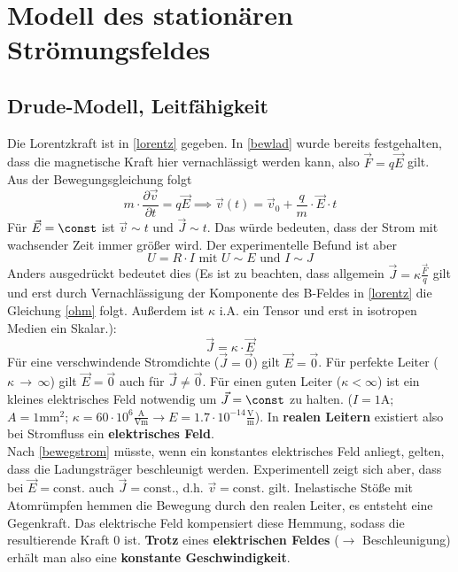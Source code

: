 \section{Modell des stationären Strömungsfeldes}
 \subsection{Drude-Modell, Leitfähigkeit}
	  Die Lorentzkraft ist in \ref{lorentz} gegeben. In \ref{bewlad} wurde bereits festgehalten, dass die magnetische Kraft hier vernachlässigt werden kann, also $\vec{F}=q\vec{E}$ gilt.  Aus der Bewegungsgleichung folgt
	        \begin{equation}\label{bewegstrom}
		        m \cdot \dfrac{\partial \vec{v}}{\partial t} =  q \vec{E} \implies \vec{v}(t) = \vec{v}_0 + \dfrac{ q}{ m} \cdot \vec{E} \cdot t
	        \end{equation}
	    Für \(\vec{E} = \const \) ist \(\vec{v} \sim t\) und \(\vec{J} \sim t \). Das würde bedeuten, dass der Strom mit wachsender Zeit immer größer wird. Der experimentelle Befund ist aber
	        \begin{equation}
		        U =  R \cdot  I \text{ mit }  U \sim E \text{ und }  I \sim J
	        \end{equation}
	   Anders ausgedrückt bedeutet dies (Es ist zu beachten, dass allgemein $\vec{J}=\kappa\frac{\vec{F}}{q}$ gilt und erst durch Vernachlässigung der Komponente des B-Feldes in \ref{lorentz} die Gleichung \ref{ohm} folgt. Außerdem ist $\kappa$ i.A. ein Tensor und erst in isotropen Medien ein Skalar.): 
	        \begin{equation}\label{ohm}
	        	\boxed{\vec{J} = \kappa \cdot \vec{E}}
	        \end{equation}
Für eine verschwindende Stromdichte ($\vec{J} = \vec{0}$) gilt \(\vec{E} = \vec{0} \). Für perfekte Leiter (\(\kappa \,\rightarrow\, \infty \)) gilt \(\vec{E} = \vec{0} \) auch für  $\vec{J} \ne \vec{0}$. Für einen guten Leiter (\(\kappa < \infty \)) ist ein kleines elektrisches Feld notwendig um \(\vec{J} = \const \) zu halten. ($I=1\mathrm{A}$; $A=1\mathrm{mm^2}$; $\kappa=60\cdot 10^6\mathrm{\frac{A}{Vm}} \to E=1.7 \cdot 10^{-14}\mathrm{\frac{V}{m}}$). In \textbf{realen Leitern} existiert also bei Stromfluss ein \textbf{elektrisches Feld}.\\
	        Nach \ref{bewegstrom} müsste, wenn ein konstantes elektrisches Feld anliegt, gelten, dass die Ladungsträger beschleunigt werden. Experimentell zeigt sich aber, dass bei $\vec{E} = \text{const.}$ auch $\vec{J} = \text{const.}$, d.h. $\vec{v} = \text{const.}$ gilt. Inelastische Stöße mit Atomrümpfen hemmen die Bewegung durch den realen Leiter, es entsteht eine Gegenkraft. Das elektrische Feld kompensiert diese Hemmung, sodass die resultierende Kraft 0 ist. \textbf{Trotz} eines \textbf{elektrischen Feldes} ($\to$ Beschleunigung) erhält man also eine \textbf{konstante Geschwindigkeit}.\\

